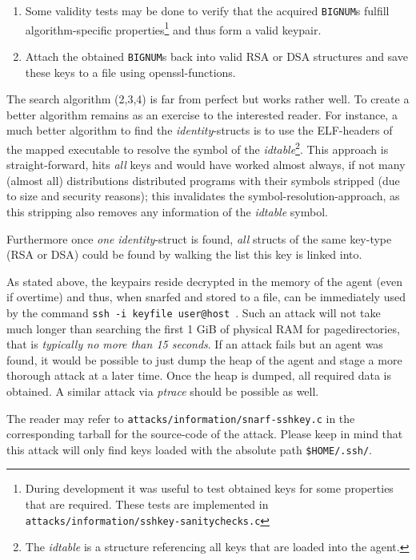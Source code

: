 \begin{enumerate}
	\item Some validity tests may be done to verify that the acquired
	\texttt{BIGNUM}s fulfill algorithm-specific properties\footnote{During
	development it was useful to test obtained keys for some properties that
	are required. These tests are implemented in
	\texttt{attacks/information/sshkey-sanitychecks.c}} and thus form a
	valid keypair.

	\item Attach the obtained \texttt{BIGNUM}s back into valid RSA or DSA
	structures and save these keys to a file using openssl-functions.
	
\end{enumerate}
	
The search algorithm (2,3,4) is far from perfect but works rather well.  To
create a better algorithm remains as an exercise to the interested reader. For
instance, a much better algorithm to find the \emph{identity}-structs is to use
the ELF-headers of the mapped executable to resolve the symbol of the
\emph{idtable}\footnote{The \emph{idtable} is a structure referencing all keys
that are loaded into the agent.}. This approach is straight-forward, hits
\emph{all} keys and would have worked almost always, if not many (almost all)
distributions distributed programs with their symbols stripped (due to size and
security reasons); this invalidates the symbol-resolution-approach, as this
stripping also removes any information of the \emph{idtable} symbol.

Furthermore once \emph{one} \emph{identity}-struct is found, \emph{all} structs
of the same key-type (RSA or DSA) could be found by walking the list this key is
linked into.

As stated above, the keypairs reside decrypted in the memory of the agent (even
if overtime) and thus, when snarfed and stored to a file, can be immediately
used by the command \texttt{ssh~-i~keyfile~user@host}~.  Such an attack will not
take much longer than searching the first 1 GiB of physical RAM for
pagedirectories, that is \emph{typically no more than 15 seconds}. If an attack
fails but an agent was found, it would be possible to just dump the heap of the
agent and stage a more thorough attack at a later time. Once the heap is dumped,
all required data is obtained. A similar attack via \emph{ptrace} should be
possible as well.

The reader may refer to \texttt{attacks/information/snarf-sshkey.c} in the
corresponding tarball for the source-code of the attack. Please keep in mind
that this attack will only find keys loaded with the absolute path
\texttt{\$HOME/.ssh/}.


